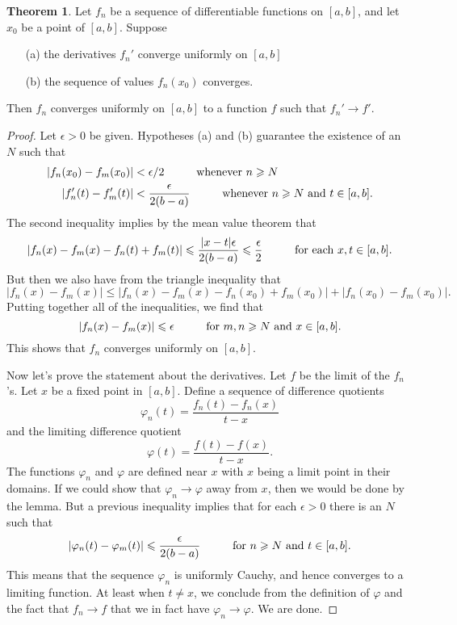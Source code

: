 \documentclass[12pt]{article}
\theoremstyle{definition}
\theoremstyle{theorem}
\newtheorem{theorem}[definition]{Theorem}
\begin{document}
\begin{theorem}
Let $f_n$ be a sequence of differentiable functions on $[a,b]$, and let $x_0$ be a point of $[a,b]$. Suppose 
\begin{enumerate}
\item[(a)] the derivatives $f_n'$ converge uniformly on $[a,b]$
\item[(b)] the sequence of values $f_n(x_0)$ converges. 
\end{enumerate}
Then $f_n$ converges uniformly on $[a,b]$ to a function $f$ such that $f_n' \to f'$. 
\end{theorem}

\begin{proof}
Let $\epsilon > 0$ be given. Hypotheses (a) and (b) guarantee the existence of an $N$ such that 
\begin{align*}
|f_n(x_0) - f_m(x_0)| &< \epsilon/2 \hspace{10mm} \text{whenever $n \geqslant N$} \\
|f_n'(t) - f_m'(t)| &< \frac{\epsilon}{2(b-a)} \hspace{10mm} \text{whenever $n \geqslant N$ and $t \in [a,b]$}.
\end{align*}
The second inequality implies by the mean value theorem that 
\begin{align*}
|f_n(x) - f_m(x) - f_n(t) + f_m(t)| \leqslant \frac{|x - t|\epsilon}{2(b-a)} \leqslant \frac{\epsilon}{2} \hspace{10mm} \text{for each $x,t \in [a,b]$.}
\end{align*}
But then we also have from the triangle inequality that  
\[
|f_n(x) - f_m(x)| \leqslant |f_n(x) - f_m(x) - f_n(x_0) + f_m(x_0)| + |f_n(x_0) - f_m(x_0)|.
\]
Putting together all of the inequalities, we find that 
\[
|f_n(x) - f_m(x)| \leqslant \epsilon \hspace{10mm} \text{for $m,n \geqslant N$ and $x \in [a,b]$.}
\]
This shows that $f_n$ converges uniformly on $[a,b]$. 

Now let's prove the statement about the derivatives. Let $f$ be the limit of the $f_n$'s. Let $x$ be a fixed point in $[a,b]$.  Define a sequence of difference quotients 
\[
\varphi_n(t) = \frac{f_n(t) - f_n(x)}{t-x}
\]
and the limiting difference quotient 
\[
\varphi(t) = \frac{f(t) - f(x)}{t-x}.
\]
The functions $\varphi_n$ and $\varphi$ are defined near $x$ with $x$ being a limit point in their domains. If we could show that $\varphi_n \to \varphi$ away from $x$, then we would be done by the lemma. But a previous inequality implies that for each $\epsilon > 0$ there is an $N$ such that 
\[
|\varphi_n(t) - \varphi_m(t)| \leqslant \frac{\epsilon}{2(b-a)} \hspace{10mm} \text{for $n \geqslant N$ and $t \in [a,b]$}.
\]
This means that the sequence $\varphi_n$ is uniformly Cauchy, and hence converges to a limiting function. At least when $t \ne x$, we conclude from the definition of $\varphi$ and the fact that $f_n \to f$ that we in fact have $\varphi_n \to \varphi$. We are done.
\end{proof}
\end{document}
